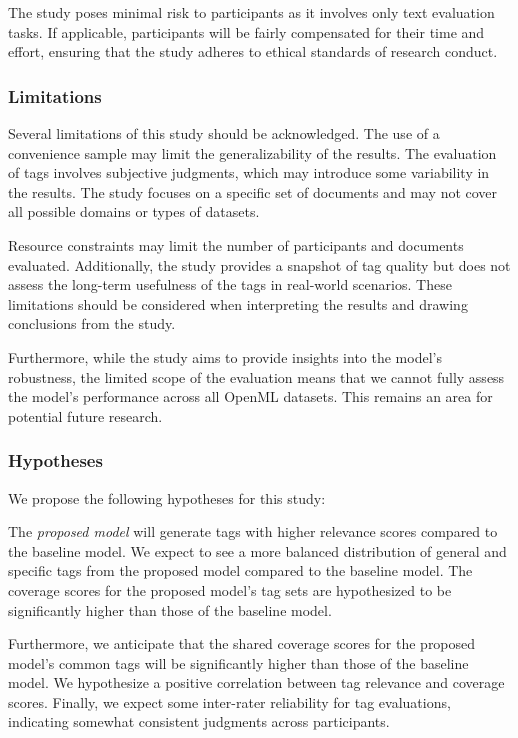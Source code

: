 The study poses minimal risk to participants as it involves only text evaluation tasks. If applicable, participants will be fairly compensated for their time and effort, ensuring that the study adheres to ethical standards of research conduct.

\subsubsection{Limitations}
Several limitations of this study should be acknowledged. The use of a convenience sample may limit the generalizability of the results. The evaluation of tags involves subjective judgments, which may introduce some variability in the results. The study focuses on a specific set of documents and may not cover all possible domains or types of datasets.

Resource constraints may limit the number of participants and documents evaluated. Additionally, the study provides a snapshot of tag quality but does not assess the long-term usefulness of the tags in real-world scenarios. These limitations should be considered when interpreting the results and drawing conclusions from the study.

Furthermore, while the study aims to provide insights into the model's robustness, the limited scope of the evaluation means that we cannot fully assess the model's performance across all OpenML datasets. This remains an area for potential future research.

\subsubsection{Hypotheses}
We propose the following hypotheses for this study:

The \textit{proposed model} will generate tags with higher relevance scores compared to the baseline model. We expect to see a more balanced distribution of general and specific tags from the proposed model compared to the baseline model. The coverage scores for the proposed model's tag sets are hypothesized to be significantly higher than those of the baseline model.

Furthermore, we anticipate that the shared coverage scores for the proposed model's common tags will be significantly higher than those of the baseline model. We hypothesize a positive correlation between tag relevance and coverage scores. Finally, we expect some inter-rater reliability for tag evaluations, indicating somewhat consistent judgments across participants.

